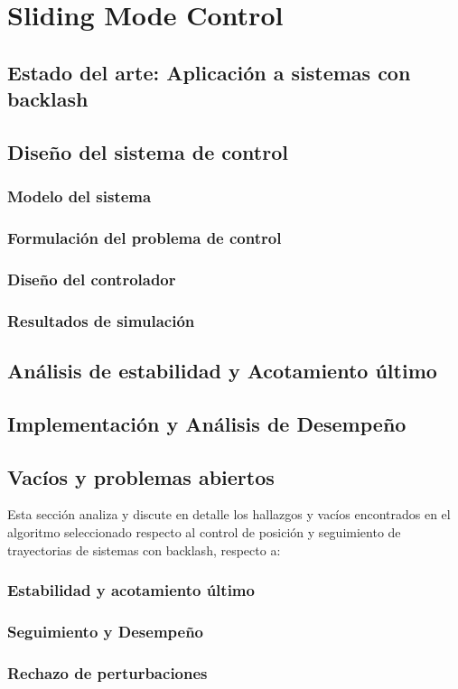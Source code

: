 \cleardoublepage %
\chapter{Sliding Mode Control}


\section{Estado del arte: Aplicaci\'on a sistemas con backlash}



\section{Dise\~no del sistema de control}

\subsection{Modelo del sistema}
\subsection{Formulaci\'on del problema de control}
\subsection{Dise\~no del controlador}
\subsection{Resultados de simulaci\'on}

\section{An\'alisis de estabilidad y Acotamiento \'ultimo}




\section{Implementaci\'on y An\'alisis de Desempe\~no}


\section{Vac\'ios y problemas abiertos}
Esta secci\'on analiza y discute en detalle los hallazgos y vac\'ios encontrados en el algoritmo seleccionado respecto al control de posici\'on y seguimiento de trayectorias de sistemas con backlash, respecto a:

\subsection{Estabilidad y acotamiento \'ultimo}

\subsection{Seguimiento y Desempe\~no}

\subsection{Rechazo de perturbaciones}

